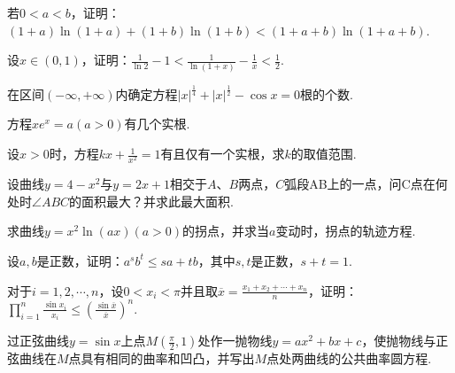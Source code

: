 \begin{xiti}
\item 若$0<a<b$，证明：$( 1 + a ) \ln ( 1 + a ) + ( 1 + b ) \ln ( 1 + b ) < ( 1 + a + b ) \ln ( 1 + a + b )$.
\item 设$x\in (0,1)$，证明：$\frac { 1 } { \ln 2 } - 1 < \frac { 1 } { \ln ( 1 + x ) } - \frac { 1 } { x } < \frac { 1 } { 2 }$.
\item 在区间$(-\infty,+\infty)$内确定方程$| x | ^ { \frac { 1 } { 4 } } + | x | ^ { \frac { 1 } { 2 } } - \cos x = 0$根的个数.
\item 方程$xe^x=a(a>0)$有几个实根.
\item 设$x>0$时，方程$kx+\frac{1}{x^{2}}=1$有且仅有一个实根，求$k$的取值范围.
\item 设曲线$y = 4 - x ^ { 2 }$与$y=2x+1$相交于$A$、$B$两点，$C$弧段AB上的一点，问C点在何处时$\angle ABC$的面积最大？并求此最大面积.
\item 求曲线$y = x ^ { 2 } \ln ( a x ) ( a > 0 )$的拐点，并求当$a$变动时，拐点的轨迹方程.
\item 设$a,b$是正数，证明：$a^{s}b^{t}\leq sa+tb$，其中$s,t$是正数，$s+t=1$.
\item 对于$i=1,2,\cdots,n$，设$0<x_{i}<\pi $并且取$\overline { x } = \frac { x _ { 1 } + x _ { 2 } + \cdots + x _ { n } } { n }$，证明：$\prod _ { i = 1 } ^ { n } \frac { \sin x _ { i } } { x _ { i } } \leqslant \left( \frac { \sin \overline { x } } { \overline { x } } \right) ^ { n }$.
\item 过正弦曲线$y=\sin x$上点$M(\frac{\pi}{2},1)$处作一抛物线$y=ax^{2}+bx+c$，使抛物线与正弦曲线在$M$点具有相同的曲率和凹凸，并写出$M$点处两曲线的公共曲率圆方程.

\end{xiti}

